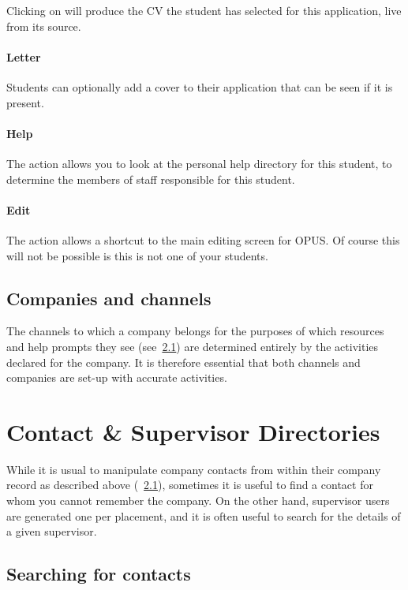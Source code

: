 \documentclass[12 pt]{book}
\begin{document}
Clicking on  will produce the CV the student has selected for this
application, live from its source.

\subsubsection{Letter}

Students can optionally add a cover  to their application that
can be seen if it is present.

\subsubsection{Help}

The  action allows you to look at the personal help directory
for this student, to determine the members of staff responsible for this
student.

\subsubsection{Edit}

The  action allows a shortcut to the main editing screen for
OPUS. Of course this will not be possible is this is not one of your students.

\section{Companies and channels}

The channels to which a company belongs for the purposes of which resources
and help prompts they see (see~\ref{}) are determined entirely by the
activities declared for the company. It is therefore essential that both
channels and companies are set-up with accurate activities.

%
%
%

\chapter{Contact \& Supervisor Directories}

While it is usual to manipulate company contacts from within their company record as described above
(~\ref{}), sometimes it is useful to find a contact for whom you cannot remember the company. On the
other hand, supervisor users are generated one per placement, and it is often useful to search for
the details of a given supervisor.

\section{Searching for contacts}
\end{document}
